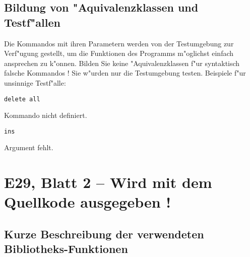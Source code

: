 \subsection*{Bildung von "Aquivalenzklassen und Testf"allen}

Die Kommandos mit ihren Parametern werden von der Testumgebung zur Verf"ugung
gestellt, um die Funktionen des Programms m"oglichst einfach ansprechen
zu k"onnen. Bilden Sie keine "Aquivalenzklassen f"ur syntaktisch
falsche Kommandos ! Sie w"urden nur die Testumgebung testen.
Beispiele f"ur unsinnige Testf"alle:
\begin{verbatim}
delete all
\end{verbatim}
Kommando nicht definiert.
\begin{verbatim}
ins
\end{verbatim}
Argument fehlt.

\newpage
\section*{E29, Blatt 2 -- Wird mit dem Quellkode ausgegeben !}


\subsection*{Kurze Beschreibung der verwendeten Bibliotheks-Funktionen}


